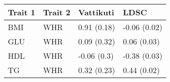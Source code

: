 \begin{table}[ht]
\centering
\begin{tabular}{llll}
  \hline
Trait 1 & Trait 2 & Vattikuti & LDSC \\ 
  \hline
BMI & WHR & 0.91 (0.18) & -0.06 (0.02) \\ 
  GLU & WHR & 0.09 (0.32) & 0.06 (0.03) \\ 
  HDL & WHR & -0.06 (0.3) & -0.38 (0.03) \\ 
  TG & WHR & 0.32 (0.23) & 0.44 (0.02) \\ 
   \hline
\end{tabular}
\end{table}
